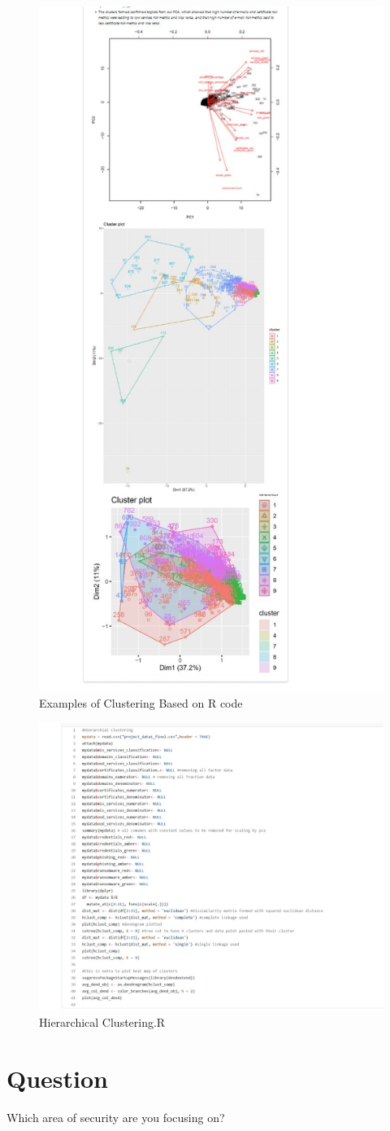 \begin{figure}[ht]
\centering
\includegraphics[angle=0,width=.7\linewidth]{GitAssignmentClustering.jpg}
\caption{Examples of Clustering Based on R code} 
\label{fig:view}
\end{figure}
\bigskip


\begin{figure}[ht]
\centering
\includegraphics[angle=0,width=.7\linewidth]{R-Code-Her.jpg}
\caption{Hierarchical Clustering.R} 
\label{fig:view}
\end{figure}
\bigskip

\section{Question}
Which area of security are you focusing on?



